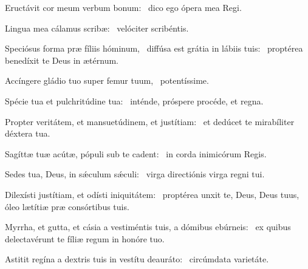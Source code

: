 \item Eructávit cor meum verbum bonum:~\psstar{} dico ego ópera mea Regi.

\item Lingua mea cálamus scribæ:~\psstar{} velóciter scribéntis.

\item Speciósus forma præ fíliis hóminum,~\pscross{} diffúsa est grátia in lábiis tuis:~\psstar{} proptérea benedíxit te Deus in ætérnum.

\item Accíngere gládio tuo super femur tuum,~\psstar{} potentíssime.

\item Spécie tua et pulchritúdine tua:~\psstar{} inténde, próspere procéde, et regna.

\item Propter veritátem, et mansuetúdinem, et justítiam:~\psstar{} et dedúcet te mirabíliter déxtera tua.

\item Sagíttæ tuæ acútæ, pópuli sub te cadent:~\psstar{} in corda inimicórum Regis.

\item Sedes tua, Deus, in sǽculum sǽculi:~\psstar{} virga directiónis virga regni tui.

\item Dilexísti justítiam, et odísti iniquitátem:~\psstar{} proptérea unxit te, Deus, Deus tuus, óleo lætítiæ præ consórtibus tuis.

\item Myrrha, et gutta, et cásia a vestiméntis tuis, a dómibus ebúrneis:~\psstar{} ex quibus delectavérunt te fíliæ regum in honóre tuo.

\item Astitit regína a dextris tuis in vestítu deauráto:~\psstar{} circúmdata varietáte.

